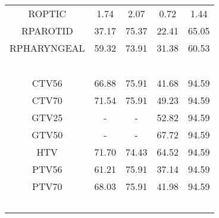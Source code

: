 \begin{sidewaystable}[p]
{\begin{tabular}{ccccc}
ROPTIC & 1.74 & 2.07 & 0.72 & 1.44 \\
RPAROTID & 37.17 & 75.37 & 22.41 & 65.05 \\
RPHARYNGEAL & 59.32 & 73.91 & 31.38 & 60.53 \\\\\\\\\\
\midrule\\       
CTV56 & 66.88 & 75.91 & 41.68 & 94.59 \\
CTV70 & 71.54 & 75.91 & 49.23 & 94.59 \\
GTV25 & - & - & 52.82 & 94.59 \\
GTV50 & - & - & 67.72 & 94.59 \\
HTV & 71.70 & 74.43 & 64.52 & 94.59 \\
PTV56 & 61.21 & 75.91 & 37.14 & 94.59 \\
PTV70 & 68.03 & 75.91 & 41.98 & 94.59 \\\
 \bottomrule\\
 \end{tabular}
}
\end{sidewaystable}


